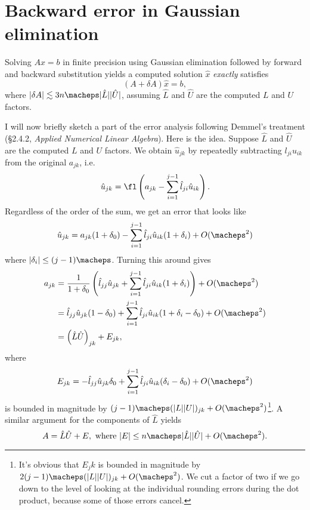 \documentclass[12pt, leqno]{article}
\begin{document}

\section{Backward error in Gaussian elimination}

Solving $Ax = b$ in finite precision using Gaussian elimination
followed by forward and backward substitution yields a computed
solution $\hat{x}$ {\em exactly} satisfies
\begin{equation} \label{gauss-bnd}
  (A + \delta A) \hat{x} = b,
\end{equation}
where $|\delta A| \lesssim 3n\macheps |\hat{L}| |\hat{U}|$, assuming
$\hat{L}$ and $\hat{U}$ are the computed $L$ and $U$ factors.

I will now briefly sketch a part of the error analysis following
Demmel's treatment (\S 2.4.2, {\em Applied Numerical Linear Algebra}).
Here is the idea.  Suppose $\hat{L}$ and $\hat{U}$ are the computed
$L$ and $U$ factors.  We obtain $\hat{u}_{jk}$ by repeatedly
subtracting $l_{ji} u_{ik}$ from the original $a_{jk}$, i.e.
\[
  \hat{u}_{jk} =
    \fl\left( a_{jk} - \sum_{i=1}^{j-1} \hat{l}_{ji} \hat{u}_{ik} \right).
\]
Regardless of the order of the sum, we get an error that looks like
\[
  \hat{u}_{jk} = a_{jk}(1+\delta_0) -
                 \sum_{i=1}^{j-1} \hat{l}_{ji} \hat{u}_{ik} (1+\delta_i) +
                 O(\macheps^2)
\]
where $|\delta_i| \leq (j-1) \macheps$.  Turning this around gives
\begin{align*}
  a_{jk} & =
  \frac{1}{1+\delta_0} \left(
    \hat{l}_{jj} \hat{u}_{jk} +
    \sum_{i=1}^{j-1} \hat{l}_{ji} \hat{u}_{ik} (1 + \delta_i)
  \right) + O(\macheps^2) \\
  & =
    \hat{l}_{jj} \hat{u}_{jk} (1 - \delta_0) +
    \sum_{i=1}^{j-1} \hat{l}_{ji} \hat{u}_{ik} (1 + \delta_i - \delta_0) +
    O(\macheps^2) \\
  & =
    \left( \hat{L} \hat{U} \right)_{jk} + E_{jk},
\end{align*}
where
\[
   E_{jk} =
    -\hat{l}_{jj} \hat{u}_{jk} \delta_0 +
    \sum_{i=1}^{j-1} \hat{l}_{ji} \hat{u}_{ik} (\delta_i - \delta_0) +
    O(\macheps^2)
\]
is bounded in magnitude by $(j-1) \macheps (|L||U|)_{jk} + O(\macheps^2)$\footnote{
  It's obvious that $E_jk$ is bounded in magnitude by $2(j-1)
  \macheps(|L||U|)_{jk} + O(\macheps^2)$.  We cut a factor of two if
  we go down to the level of looking at the individual rounding errors
  during the dot product, because some of those errors cancel.
}.
A similar argument for the components of $\hat{L}$ yields
\[
  A = \hat{L} \hat{U} + E, \mbox{ where }
  |E| \leq n \macheps |\hat{L}| |\hat{U}| + O(\macheps^2).
\]
\end{document}
